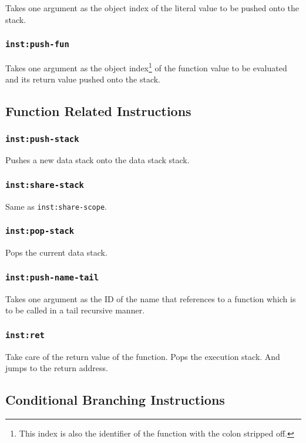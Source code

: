 \documentclass{article}
\newcommand{\inst}[1] {\texttt{inst:#1}}
\begin{document}
Takes one argument as the object index of the literal value to be pushed onto the stack.

\subsubsection{\inst{push-fun}}

Takes one argument as the object index\footnote{This index is also the identifier of the function with the colon stripped off.} of the function value to be evaluated and its return value pushed onto the stack.

\subsection{Function Related Instructions}

\subsubsection{\inst{push-stack}}

Pushes a new data stack onto the data stack stack.

\subsubsection{\inst{share-stack}}

Same as \inst{share-scope}.

\subsubsection{\inst{pop-stack}}

Pops the current data stack.

\subsubsection{\inst{push-name-tail}}

Takes one argument as the ID of the name that references to a function which is to be called in a tail recursive manner.

\subsubsection{\inst{ret}}

Take care of the return value of the function. Pops the execution stack. And jumps to the return address.

\subsection{Conditional Branching Instructions}
\end{document}
